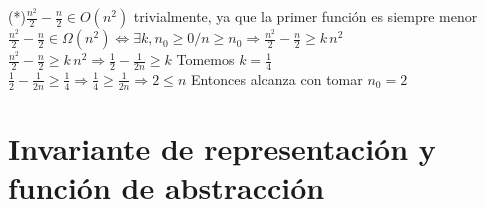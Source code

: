 \documentclass[10pt, a4paper]{article}
\begin{document}
(*)$\frac{n^2}{2} - \frac{n}{2} \in O(n^2)$ trivialmente, ya que la primer función es siempre menor\\
$\frac{n^2}{2} - \frac{n}{2} \in \Omega (n^2) \Leftrightarrow \exists k, n_0 \ge 0 / n\ge n_0 \Rightarrow \frac{n^2}{2} - \frac{n}{2} \ge k \, n^2$\\
$\frac{n^2}{2} - \frac{n}{2} \ge k \, n^2 \Rightarrow  \frac{1}{2} - \frac{1}{2n} \ge k$ Tomemos $k = \frac{1}{4}$\\
$\frac{1}{2} - \frac{1}{2n} \ge \frac{1}{4} \Rightarrow \frac{1}{4} \ge \frac{1}{2n} \Rightarrow 2 \le n$ Entonces alcanza con tomar $n_0 = 2$



\section{Invariante de representación y \\función de abstracción}
\end{document}
